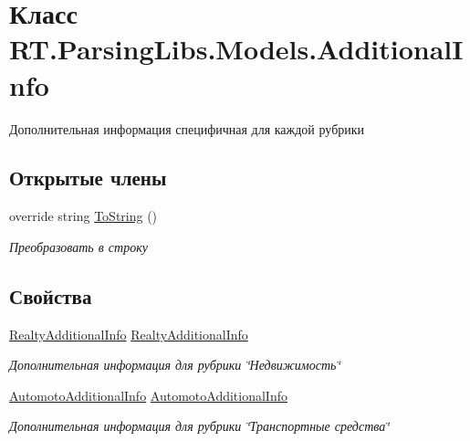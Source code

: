 \hypertarget{class_r_t_1_1_parsing_libs_1_1_models_1_1_additional_info}{\section{Класс R\+T.\+Parsing\+Libs.\+Models.\+Additional\+Info}
\label{class_r_t_1_1_parsing_libs_1_1_models_1_1_additional_info}
}


Дополнительная информация специфичная для каждой рубрики  


\subsection*{Открытые члены}
\begin{DoxyCompactItemize}
\item 
override string \hyperlink{class_r_t_1_1_parsing_libs_1_1_models_1_1_additional_info_ae7aba24bcb1b1f3bfd006f495303015e}{To\+String} ()
\begin{DoxyCompactList}\small\item\em Преобразовать в строку \end{DoxyCompactList}\end{DoxyCompactItemize}
\subsection*{Свойства}
\begin{DoxyCompactItemize}
\item 
\hyperlink{class_r_t_1_1_parsing_libs_1_1_models_1_1_realty_additional_info}{Realty\+Additional\+Info} \hyperlink{class_r_t_1_1_parsing_libs_1_1_models_1_1_additional_info_a61bdaef5c84d0e7804052bf4edf7ac86}{Realty\+Additional\+Info}
\begin{DoxyCompactList}\small\item\em Дополнительная информация для рубрики \char`\"{}Недвижимость\char`\"{} \end{DoxyCompactList}\item 
\hyperlink{class_r_t_1_1_parsing_libs_1_1_models_1_1_automoto_additional_info}{Automoto\+Additional\+Info} \hyperlink{class_r_t_1_1_parsing_libs_1_1_models_1_1_additional_info_a8239031eec55a96fe4da7e3b1aba933b}{Automoto\+Additional\+Info}
\begin{DoxyCompactList}\small\item\em Дополнительная информация для рубрики \char`\"{}Транспортные средства\char`\"{} \end{DoxyCompactList}\end{DoxyCompactItemize}


